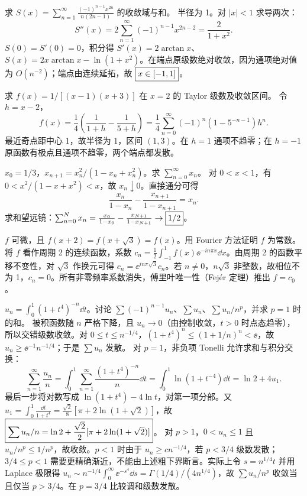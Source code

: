求 $S(x)=\displaystyle\sum_{n=1}^\infty\frac{(-1)^{n-1}x^{2n}}{n(2n-1)}$ 的收敛域与和。
\sol 半径为 1。对 $|x|<1$ 求导两次：
\[
S''(x)=2\sum_{n=1}^\infty(-1)^{n-1}x^{2n-2}=\frac2{1+x^2}.
\]
$S(0)=S'(0)=0$，积分得 $S'(x)=2\arctan x$、$S(x)=2x\arctan x-\ln(1+x^2)$。在端点原级数绝对收敛，因为通项绝对值为 $O(n^{-2})$；端点由连续延拓，故 $\boxed{x\in[-1,1]}$。

求 $f(x)=1/[(x-1)(x+3)]$ 在 $x=2$ 的 Taylor 级数及收敛区间。
\sol 令 $h=x-2$，
\[
f(x)=\frac14\left(\frac1{1+h}-\frac1{5+h}\right)
=\frac14\sum_{n=0}^\infty(-1)^n(1-5^{-n-1})h^n.
\]
最近奇点距中心 1，故半径为 1，区间 $(1,3)$。在 $h=1$ 通项不趋零；在 $h=-1$ 原函数有极点且通项不趋零，两个端点都发散。

$x_0=1/3$，$x_{n+1}=x_n^2/(1-x_n+x_n^2)$。求 $\sum_{n=0}^\infty x_n$。
\sol 对 $0<x<1$，有 $0<x^2/(1-x+x^2)<x$，故 $x_n\downarrow0$。直接通分可得
\[
\frac{x_n}{1-x_n}-\frac{x_{n+1}}{1-x_{n+1}}=x_n.
\]
求和望远镜：$\sum_{n=0}^N x_n=\frac{x_0}{1-x_0}-\frac{x_{N+1}}{1-x_{N+1}}\to\boxed{1/2}$。

$f$ 可微，且 $f(x+2)=f(x+\sqrt3)=f(x)$。用 Fourier 方法证明 $f$ 为常数。
\sol 将 $f$ 看作周期 2 的连续函数，系数
$c_n=\frac12\int_{-1}^1f(x)\ee^{-in\pi x}\dd x$。由周期 2 的函数平移不变性，对 $\sqrt3$ 作换元可得
$c_n=\ee^{in\pi\sqrt3}c_n$。若 $n\ne0$，$n\sqrt3$ 非整数，故相位不为 1，$c_n=0$。所有非零频率系数消失，傅里叶唯一性（Fejér 定理）推出 $f=c_0$。

$u_n=\int_0^1(1+t^4)^{-n}\dd t$。讨论 $\sum(-1)^{n-1}u_n$、$\sum u_n$、$\sum u_n/n^p$，并求 $p=1$ 时的和。
\sol 被积函数随 $n$ 严格下降，且 $u_n\to0$（由控制收敛，$t>0$ 时点态趋零），所以交错级数收敛。对 $0\le t\le n^{-1/4}$，$(1+t^4)^n\le(1+1/n)^n<\ee$，故 $u_n\ge\ee^{-1}n^{-1/4}$；于是 $\sum u_n$ 发散。
对 $p=1$，非负项 Tonelli 允许求和与积分交换：
\[
\sum_{n=1}^\infty\frac{u_n}n
=\int_0^1\sum_{n=1}^\infty\frac{(1+t^4)^{-n}}n\dd t
=\int_0^1\ln(1+t^{-4})\dd t
=\ln2+4u_1.
\]
最后一步将对数写成 $\ln(1+t^4)-4\ln t$，对第一项分部。又
$u_1=\int_0^1\frac{\dd t}{1+t^4}
=\frac{\sqrt2}{8}[\pi+2\ln(1+\sqrt2)]$，故
$\boxed{\sum u_n/n=\ln2+\frac{\sqrt2}{2}[\pi+2\ln(1+\sqrt2)]}$。
对 $p>1$，$0<u_n\le1$ 且 $u_n/n^p\le1/n^p$，故收敛。$p<1$ 时由于 $u_n\ge c n^{-1/4}$，若 $p<3/4$ 级数发散；$3/4\le p<1$ 需要更精确渐近，不能由上述粗下界断言。实际上令 $s=n^{1/4}t$ 并用 Laplace 极限得 $u_n\sim n^{-1/4}\int_0^\infty\ee^{-s^4}\dd s=\Gamma(1/4)/(4n^{1/4})$，故 $\sum u_n/n^p$ 收敛当且仅当 $p>3/4$。在 $p=3/4$ 比较调和级数发散。
